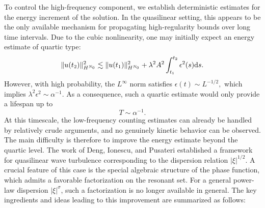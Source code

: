 \documentclass[UTF-8,reqno]{amsart}
\numberwithin{equation}{section}
\theoremstyle{definition}
\def\dif{{\mathord{{\rm d}}}}
\def\dif{{\mathord{{\rm d}}}}
\begin{document}
To control the high-frequency component, we establish deterministic estimates for the energy increment of the solution. 
In the quasilinear setting, this appears to be the only available mechanism for propagating high-regularity bounds over long time intervals. 
Due to the cubic nonlinearity, one may initially expect an energy estimate of quartic type:
\begin{align*}
 \|u(t_2)\|_{H^{N_0}}^2
 \lesssim
 \|u(t_1)\|_{H^{N_0}}^2
 +\lambda^2A^2\int_{t_1}^{t_2}\epsilon^2(s)\dif s.
\end{align*}
However, with high probability, the $L^\infty$ norm satisfies $\epsilon(t)\sim L^{-1/2},$
which implies $ \lambda^2\epsilon^2\sim \alpha^{-1}.$ 
As a consequence, such a quartic estimate would only provide a lifespan up to
\[
T\sim \alpha^{-1}.
\]
At this timescale, the low-frequency counting estimates can already be handled by relatively crude arguments, and no genuinely kinetic behavior can be observed. 
The main difficulty is therefore to improve the energy estimate beyond the quartic level.  The work of Deng, Ionescu, and Pusateri \cite{DIP25a,DIP25}
established a framework for quasilinear wave turbulence  corresponding to
the dispersion relation $|\xi|^{1/2}$. A crucial feature of this case is
the special algebraic structure of the phase function, which admits a
favorable factorization on the resonant set.  For a general power-law dispersion
$|\xi|^\sigma$, such a factorization is no longer available in general.
The key ingredients and ideas leading to this improvement are summarized as follows:  
\end{document}
